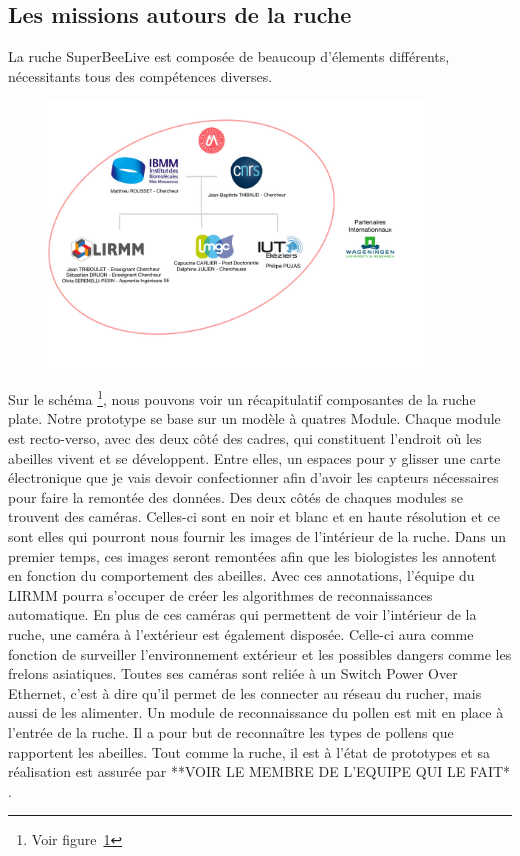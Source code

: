 \documentclass[11pt,french,a4paper]{report}
\begin{document}
{\subsection{Les missions autours de la ruche}
La ruche SuperBeeLive est composée de beaucoup d'élements différents, nécessitants tous des compétences diverses.
\begin{figure}[!h]
    \centering 
    \includegraphics[width=10cm]{./img/orga.jpg}
    \label{resume_hive}
\end{figure}
Sur le schéma \footnote{Voir figure \ref{resume_hive}}, nous pouvons voir un récapitulatif composantes de la ruche plate. 
Notre prototype se base sur un modèle à quatres Module. Chaque module est recto-verso, avec des deux côté des cadres, 
qui constituent l'endroit où les abeilles vivent et se développent. Entre elles, un espaces pour y glisser une carte électronique 
que je vais devoir confectionner afin d'avoir les capteurs nécessaires pour faire la remontée des données. 
Des deux côtés de chaques modules se trouvent des caméras. Celles-ci sont en noir et blanc et en haute résolution et ce sont elles
qui pourront nous fournir les images de l'intérieur de la ruche. Dans un premier temps, ces images seront remontées afin 
que les biologistes les annotent en fonction du comportement des abeilles. Avec ces annotations, l'équipe du LIRMM pourra s'occuper 
de créer les algorithmes de reconnaissances automatique. En plus de ces caméras qui permettent de voir l'intérieur de la ruche, une caméra à 
l'extérieur est également disposée. Celle-ci aura comme fonction de surveiller l'environnement extérieur et les possibles dangers comme
les frelons asiatiques. Toutes ses caméras sont reliée à un Switch Power Over Ethernet, c'est à dire qu'il permet de les connecter au réseau
du rucher, mais aussi de les alimenter. Un module de reconnaissance du pollen est mit en place à l'entrée de la ruche. Il a pour but 
de reconnaître les types de pollens que rapportent les abeilles. Tout comme la ruche, il est à l'état de prototypes et sa réalisation 
est assurée par **VOIR LE MEMBRE DE L'EQUIPE QUI LE FAIT* . 

}
\end{document}
